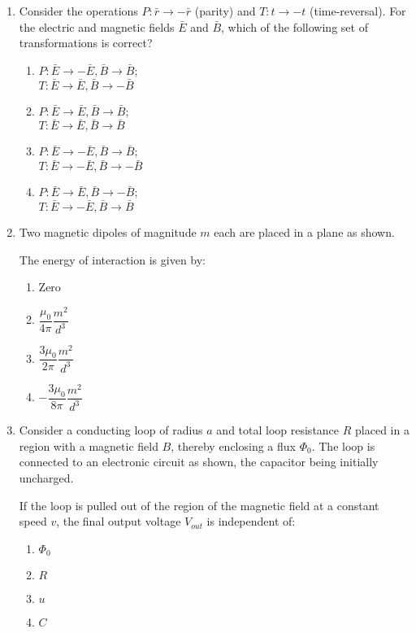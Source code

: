 \documentclass[journal]{IEEEtran}
\begin{document}
\begin{enumerate}[start=27]
\item Consider the operations $P: \bar{r} \rightarrow -\bar{r}$ (parity) and $T: t \rightarrow -t$ (time-reversal). For the electric and magnetic fields $\bar{E}$ and $\bar{B}$, which of the following set of transformations is correct?
\begin{multicols}{2}
\begin{enumerate}
\item $P: \bar{E} \rightarrow -\bar{E}, \bar{B} \rightarrow \bar{B}$;\\ $T: \bar{E} \rightarrow \bar{E}, \bar{B} \rightarrow -\bar{B}$
\item $P: \bar{E} \rightarrow \bar{E}, \bar{B} \rightarrow \bar{B}$;\\ $T: \bar{E} \rightarrow \bar{E}, \bar{B} \rightarrow \bar{B}$
\item $P: \bar{E} \rightarrow -\bar{E}, \bar{B} \rightarrow \bar{B}$;\\ $T: \bar{E} \rightarrow -\bar{E}, \bar{B} \rightarrow -\bar{B}$
\item $P: \bar{E} \rightarrow \bar{E}, \bar{B} \rightarrow -\bar{B}$; \\$T: \bar{E} \rightarrow -\bar{E}, \bar{B} \rightarrow \bar{B}$
\end{enumerate}
\end{multicols}

\item Two magnetic dipoles of magnitude $m$ each are placed in a plane as shown.


The energy of interaction is given by:
\begin{multicols}{2}
\begin{enumerate}
\item Zero
\item $\dfrac{\mu_0}{4\pi} \dfrac{m^2}{d^3}$
\item $\dfrac{3\mu_0}{2\pi} \dfrac{m^2}{d^3}$
\item $-\dfrac{3\mu_0}{8\pi} \dfrac{m^2}{d^3}$
\end{enumerate}
\end{multicols}

\item Consider a conducting loop of radius $a$ and total loop resistance $R$ placed in a region with a magnetic field $B$, thereby enclosing a flux $\Phi_0$. The loop is connected to an electronic circuit as shown, the capacitor being initially uncharged.


If the loop is pulled out of the region of the magnetic field at a constant speed $v$, the final output voltage $V_{out}$ is independent of:
\begin{multicols}{2}
\begin{enumerate}
 \item $\Phi_0$
 \item $R$
 \item $u$
 \item $C$
 \end{enumerate}
 \end{multicols}

 \end{enumerate}
\end{document}
